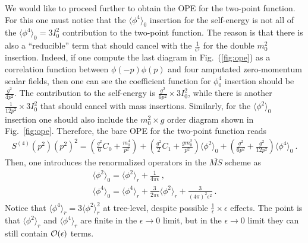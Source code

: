 \documentclass[a4paper,11pt]{article}
\begin{document}
We would like to proceed further to obtain the OPE for the two-point function. For this one must notice that the $\langle\phi^4\rangle_0$ insertion for the self-energy is not all of the $\langle \phi^4\rangle_0=3I_0^2$ contribution to the two-point function. The reason is that there is also a ``reducible'' term that should cancel with the $\frac{1}{\epsilon^2}$ for the double $m_0^2$ insertion. 
Indeed, if one compute the last diagram in Fig.~(\ref{fig:ope}) as a correlation function between $\phi(-p)\phi(p)$ and four amputated zero-momentum scalar fields, then one can see the coefficient function for $\phi_0^4$ insertion should be $\frac{g^2}{4p^2}$. The contribution to the self-energy is $\frac{g^2}{6p^2}\times 3I_0^2$, while there is another $\frac{1}{12p^2}\times 3I_0^2$ that should cancel with mass insertions. Similarly, for the $\langle \phi^2\rangle_0$ insertion one should also include the $m_0^2\times g$ order diagram shown in Fig.~\ref{fig:ope}.
Therefore, the bare OPE for the two-point function reads
\begin{align}
S^{(4)}(p^2)(p^2)^2=\left(\frac{g^2}{6}C_0+\frac{m_0^4}{p^2}\right)+\left(\frac{g^2}{2}C_1+\frac{g m_0^2}{p^2}\right)\langle \phi^2\rangle_0+\left(\frac{g^2}{6p^2}+\frac{g^2}{12p^2}\right)\langle\phi^4\rangle_0 \ .
\end{align}
Then, one introduces the renormalized operators in the $\overline{MS}$ scheme as
\begin{align}
\langle\phi^2\rangle_0=\langle \phi^2\rangle_r+\frac{1}{4\pi \epsilon} \ , \\
\langle\phi^4\rangle_0=\langle \phi^4\rangle_r+\frac{3}{2\pi \epsilon}\langle\phi^2\rangle_r+\frac{3}{(4\pi)^2\epsilon^2} \ .
\end{align}
Notice that $\langle \phi^4 \rangle_r = 3\langle \phi^2\rangle_r^2$ at tree-level, despite possible $\frac{1}{\epsilon} \times\epsilon$ effects. The point is that $\langle \phi^2\rangle_r$ and $\langle \phi^4\rangle_r$ are finite in the $\epsilon \rightarrow 0$ limit, but in the $\epsilon \rightarrow 0$ limit they can still contain ${\cal O}(\epsilon)$ terms. 
\end{document}
